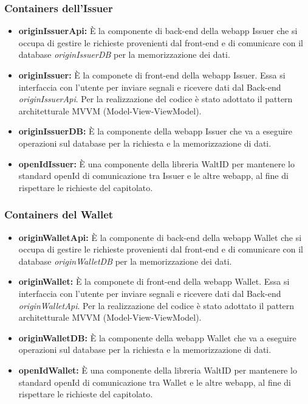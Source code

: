 \subsubsection{Containers dell'\textbf{Issuer}}
\begin{itemize}
    \item \textbf{originIssuerApi:} È la componente di back-end della webapp Issuer che si occupa di gestire le richieste provenienti dal front-end e di comunicare con il database \textit{originIssuerDB} per la memorizzazione dei dati.
    \item \textbf{originIssuer:} È la componete di front-end della webapp Issuer. Essa si interfaccia con l'utente per inviare segnali e ricevere dati dal Back-end \textit{originIssuerApi}. Per la realizzazione del codice è stato adottato il pattern architetturale MVVM (Model-View-ViewModel).
    \item \textbf{originIssuerDB:} È la componente della webapp Issuer che va a eseguire operazioni sul database per la richiesta e la memorizzazione di dati. 
    \item \textbf{openIdIssuer:} È una componente della libreria WaltID per mantenere lo standard openId di comunicazione tra Issuer e le altre webapp, al fine di rispettare le richieste del capitolato.
\end{itemize}
\subsubsection{Containers del \textbf{Wallet}}
\begin{itemize}
    \item \textbf{originWalletApi:} È la componente di back-end della webapp Wallet che si occupa di gestire le richieste provenienti dal front-end e di comunicare con il database \textit{originWalletDB} per la memorizzazione dei dati.
    \item \textbf{originWallet:} È la componete di front-end della webapp Wallet. Essa si interfaccia con l'utente per inviare segnali e ricevere dati dal Back-end \textit{originWalletApi}. Per la realizzazione del codice è stato adottato il pattern architetturale MVVM (Model-View-ViewModel).
    \item \textbf{originWalletDB:} È la componente della webapp Wallet che va a eseguire operazioni sul database per la richiesta e la memorizzazione di dati.
    \item \textbf{openIdWallet:} È una componente della libreria WaltID per mantenere lo standard openId di comunicazione tra Wallet e le altre webapp, al fine di rispettare le richieste del capitolato.
\end{itemize}
